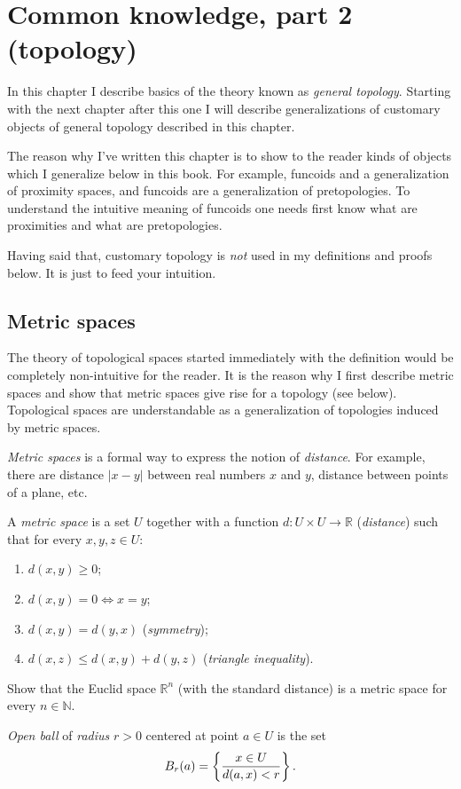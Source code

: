 
\chapter{\label{common-top}Common knowledge, part 2 (topology)}

In this chapter I describe basics of the theory known as \emph{general
topology}. Starting with the next chapter after this one I will describe
generalizations of customary objects of general topology described
in this chapter.

The reason why I've written this chapter is to show to the reader
kinds of objects which I generalize below in this book. For example,
funcoids and a generalization of proximity spaces, and funcoids are
a generalization of pretopologies. To understand the intuitive meaning
of funcoids one needs first know what are proximities and what are
pretopologies.

Having said that, customary topology is \emph{not} used in my definitions
and proofs below. It is just to feed your intuition.


\section{Metric spaces}

The theory of topological spaces started immediately with the definition
would be completely non-intuitive for the reader. It is the reason
why I first describe metric spaces and show that metric spaces give
rise for a topology (see below). Topological spaces are understandable
as a generalization of topologies induced by metric spaces.

\emph{Metric spaces} is a formal way to express the notion of \emph{distance}.
For example, there are distance $|x-y|$ between real numbers $x$
and $y$, distance between points of a plane, etc.
\begin{defn}
A \emph{metric space} is a set
$U$ together with a function $d:U\times U\rightarrow\mathbb{R}$
(\emph{distance}) such that for every $x,y,z\in U$:
\begin{enumerate}
\item $d(x,y)\ge0$;
\item $d(x,y)=0\Leftrightarrow x=y$;
\item $d(x,y)=d(y,x)$ (\emph{symmetry});
\item {}$d(x,z)\le d(x,y)+d(y,z)$ (\emph{triangle
inequality}).
\end{enumerate}
\end{defn}
\begin{xca}
Show that the Euclid space $\mathbb{R}^{n}$ (with the standard distance)
is a metric space for every $n\in\mathbb{N}$.\end{xca}
\begin{defn}
\emph{Open ball} of \emph{radius} $r>0$ centered
at point $a\in U$ is the set
\[
B_{r}(a)=\left\{ \frac{x\in U}{d(a,x)<r}\right\}.
\]

\end{defn}


